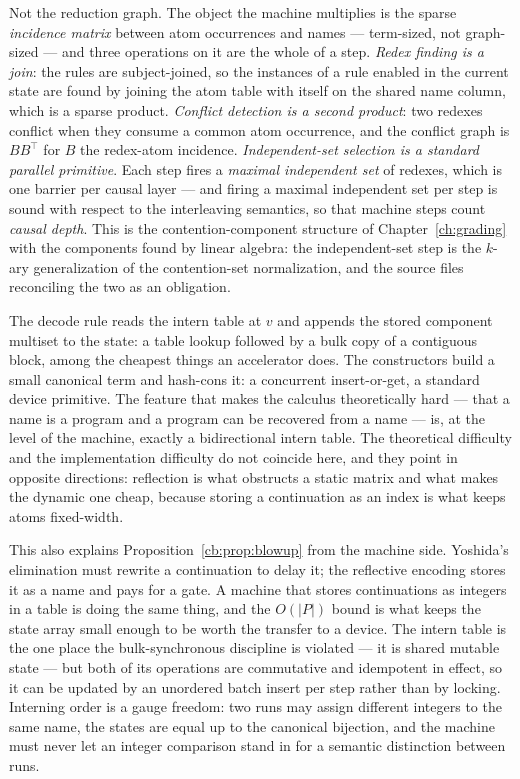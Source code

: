 Not the reduction graph. The object the machine multiplies is the sparse \emph{incidence
matrix} between atom occurrences and names --- term-sized, not graph-sized --- and three
operations on it are the whole of a step. \emph{Redex finding is a join}: the rules are
subject-joined, so the instances of a rule enabled in the current state are found by
joining the atom table with itself on the shared name column, which is a sparse product.
\emph{Conflict detection is a second product}: two redexes conflict when they consume a
common atom occurrence, and the conflict graph is $BB^{\top}$ for $B$ the redex-atom
incidence. \emph{Independent-set selection is a standard parallel primitive}. Each step
fires a \emph{maximal independent set} of redexes, which is one barrier per causal layer
--- and firing a maximal independent set per step is sound with respect to the
interleaving semantics, so that machine steps count \emph{causal depth}. This is the
contention-component structure of Chapter~\ref{ch:grading} with the components found by
linear algebra: the independent-set step is the $k$-ary generalization of the
contention-set normalization, and the source files reconciling the two as an obligation.

\begin{principle}
\label{cb:prin:reflection}
The decode rule reads the intern table at $v$ and appends the stored component multiset to
the state: a table lookup followed by a bulk copy of a contiguous block, among the cheapest
things an accelerator does. The constructors build a small canonical term and hash-cons it:
a concurrent insert-or-get, a standard device primitive. The feature that makes the
calculus theoretically hard --- that a name is a program and a program can be recovered
from a name --- is, at the level of the machine, exactly a bidirectional intern table. The
theoretical difficulty and the implementation difficulty do not coincide here, and they
point in opposite directions: reflection is what obstructs a static matrix and what makes
the dynamic one cheap, because storing a continuation as an index is what keeps atoms
fixed-width.
\end{principle}

This also explains Proposition~\ref{cb:prop:blowup} from the machine side. Yoshida's
elimination must rewrite a continuation to delay it; the reflective encoding stores it as a
name and pays for a gate. A machine that stores continuations as integers in a table is
doing the same thing, and the $O(|P|)$ bound is what keeps the state array small enough
to be worth the transfer to a device. The intern table is the one place the
bulk-synchronous discipline is violated --- it is shared mutable state --- but both of its
operations are commutative and idempotent in effect, so it can be updated by an unordered
batch insert per step rather than by locking. Interning order is a gauge freedom: two runs
may assign different integers to the same name, the states are equal up to the canonical
bijection, and the machine must never let an integer comparison stand in for a semantic
distinction between runs.

